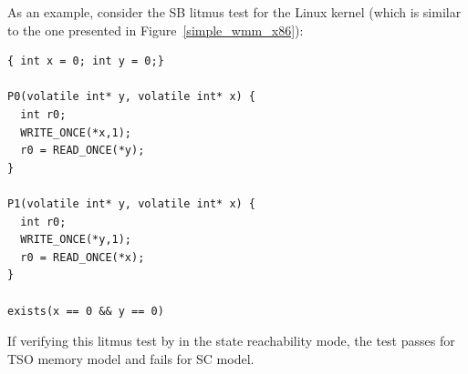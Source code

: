 As an example, consider the SB litmus test for the Linux kernel (which is similar to the one presented in Figure~\ref{simple_wmm_x86}):
\begin{lstlisting}
{ int x = 0; int y = 0;}

P0(volatile int* y, volatile int* x) {
  int r0;
  WRITE_ONCE(*x,1);
  r0 = READ_ONCE(*y);
}

P1(volatile int* y, volatile int* x) {
  int r0;
  WRITE_ONCE(*y,1);
  r0 = READ_ONCE(*x);
}

exists(x == 0 && y == 0)
\end{lstlisting}

If verifying this litmus test by \porthos[2] in the state reachability mode, the test passes for TSO memory model and fails for SC model.

